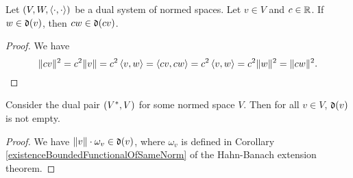 \begin{lemma} \label{dualitySetRealMultiple}
Let $\sSet{V, W, \pair{\cdot,\cdot}}$ be a dual system of normed spaces. Let $v\in V$ and $c \in \mathbb{R}$. If $w\in\operatorname{\mathfrak{d}}(v)$, then $cw\in \operatorname{\mathfrak{d}}(cv)$.
\end{lemma}
\begin{proof}
We have
\[ \lVert cv\rVert^2 = c^2\lVert v\rVert = c^2\left\langle v,w \right\rangle = \left\langle cv,cw \right\rangle = c^2 \left\langle v,w \right\rangle = c^2\lVert w\rVert^2 = \lVert cw\rVert^2. \]
\end{proof}

\begin{proposition} \label{dualitySetNonEmpty}
Consider the dual pair $\sSet{V^*, V}$ for some normed space $V$. Then for all $v\in V$, $\operatorname{\mathfrak{d}}(v)$ is not empty.
\end{proposition}
\begin{proof}
We have $\lVert v\rVert\cdot \omega_v\in \operatorname{\mathfrak{d}}(v)$, where $\omega_v$ is defined in Corollary \ref{existenceBoundedFunctionalOfSameNorm} of the Hahn-Banach extension theorem.
\end{proof}

